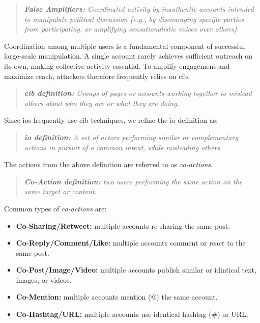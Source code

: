 \documentclass{article}
\begin{document}
\begin{quote}
  \textit{\textbf{False Amplifiers:} Coordinated activity by inauthentic accounts intended to manipulate political discussion (e.g., by discouraging specific parties from participating, or amplifying sensationalistic voices over others).} \cite{weedon2017information}
\end{quote}

Coordination among multiple users is a fundamental component of successful large-scale manipulation. A single account rarely achieves sufficient outreach on its own, making collective activity essential. To amplify engagement and maximize reach, attackers therefore frequently relies on \ac{cib}. \cite{coordinated2019Twitter, detecting2022financial}

\begin{quote}
  \textit{\textbf{\ac{cib} definition:} Groups of pages or accounts working together to mislead
  others about who they are or what they are doing.} \cite{mannocci2024detection, gleicher2018coordinated}
\end{quote}

Since \acp{io} frequently use \ac{cib} techniques, we refine the \ac{io} definition as:
\begin{quote}
  \textit{\textbf{\ac{io} definition:} A set of actors performing similar or complementary actions in pursuit of a common intent, while misleading others.}
\end{quote}

The actions from the above definition are referred to as \textit{co-actions}. 

\begin{quote}
  \textit{\textbf{Co-Action  definition:}  two users performing the same action on the same target
or content. \cite{mannocci2024detection}}
\end{quote}

Common types of \textit{co-actions} are: \cite{mannocci2024detection, luceri2024unmasking, vishnuprasad2024tracking, gang2020coordinating, toolkit2024coordination}

\begin{itemize}
    \item \textbf{Co-Sharing/Retweet:} multiple accounts re-sharing the same post.
    \item \textbf{Co-Reply/Comment/Like:} multiple accounts comment or react to the same post.
    \item \textbf{Co-Post/Image/Video:} multiple accounts publish similar or idintical text, images, or videos. 
    \item \textbf{Co-Mention:} multiple accounts mention (@) the same account.
    \item \textbf{Co-Hashtag/URL:} multiple accounts use identical hashtag (\#) or URL. 
\end{itemize}
\end{document}
